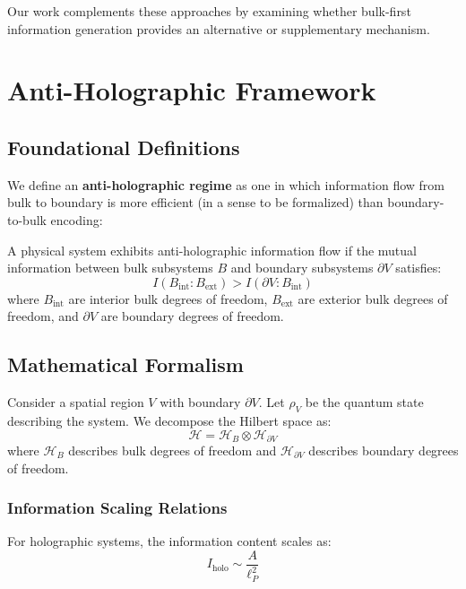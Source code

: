 \documentclass[twocolumn,aps,prd,superscriptaddress,nofootinbib]{revtex4-2}
\begin{document}
Our work complements these approaches by examining whether bulk-first information generation provides an alternative or supplementary mechanism.

\section{Anti-Holographic Framework}

\subsection{Foundational Definitions}

We define an \textbf{anti-holographic regime} as one in which information flow from bulk to boundary is more efficient (in a sense to be formalized) than boundary-to-bulk encoding:

\begin{definition}
A physical system exhibits anti-holographic information flow if the mutual information between bulk subsystems $B$ and boundary subsystems $\partial V$ satisfies:
\begin{equation}
I(B_{\text{int}} : B_{\text{ext}}) > I(\partial V : B_{\text{int}})
\label{eq:anti_holographic_condition}
\end{equation}
where $B_{\text{int}}$ are interior bulk degrees of freedom, $B_{\text{ext}}$ are exterior bulk degrees of freedom, and $\partial V$ are boundary degrees of freedom.
\end{definition}

\subsection{Mathematical Formalism}

Consider a spatial region $V$ with boundary $\partial V$. Let $\rho_V$ be the quantum state describing the system. We decompose the Hilbert space as:
\begin{equation}
\mathcal{H} = \mathcal{H}_B \otimes \mathcal{H}_{\partial V}
\end{equation}
where $\mathcal{H}_B$ describes bulk degrees of freedom and $\mathcal{H}_{\partial V}$ describes boundary degrees of freedom.

\subsubsection{Information Scaling Relations}

For holographic systems, the information content scales as:
\begin{equation}
I_{\text{holo}} \sim \frac{A}{\ell_P^2}
\end{equation}
\end{document}
